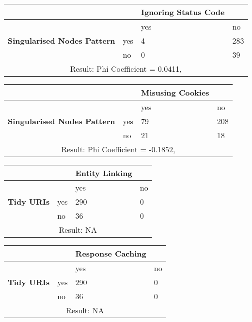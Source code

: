 \documentclass[a4paper,12pt]{article}
\begin{document}
\begin{center}
  \begin{tabular}{| p{60mm} | p{10mm} | p{35mm} | p{35mm} |}
  \hline
   & & \textbf{Ignoring Status Code} &
  \\
  \hline
  & & yes & no
  \\
  \hline
  \textbf{Singularised Nodes Pattern} & yes & 4 & 283
  \\
  \hline
   & no & 0 & 39
  \\
  \hline
  \multicolumn{4}{|c|}{Result: Phi Coefficient = 0.0411, }
  \\ \hline
  \end{tabular}
  \end{center}

\begin{center}
  \begin{tabular}{| p{60mm} | p{10mm} | p{35mm} | p{35mm} |}
  \hline
   & & \textbf{Misusing Cookies} &
  \\
  \hline
  & & yes & no
  \\
  \hline
  \textbf{Singularised Nodes Pattern} & yes & 79 & 208
  \\
  \hline
   & no & 21 & 18
  \\
  \hline
  \multicolumn{4}{|c|}{Result: Phi Coefficient = -0.1852, }
  \\ \hline
  \end{tabular}
  \end{center}

\begin{center}
  \begin{tabular}{| p{60mm} | p{10mm} | p{35mm} | p{35mm} |}
  \hline
   & & \textbf{Entity Linking} &
  \\
  \hline
  & & yes & no
  \\
  \hline
  \textbf{Tidy URIs} & yes & 290 & 0
  \\
  \hline
   & no & 36 & 0
  \\
  \hline
  \multicolumn{4}{|c|}{Result: NA}
  \\ \hline
  \end{tabular}
  \end{center}

\begin{center}
  \begin{tabular}{| p{60mm} | p{10mm} | p{35mm} | p{35mm} |}
  \hline
   & & \textbf{Response Caching} &
  \\
  \hline
  & & yes & no
  \\
  \hline
  \textbf{Tidy URIs} & yes & 290 & 0
  \\
  \hline
   & no & 36 & 0
  \\
  \hline
  \multicolumn{4}{|c|}{Result: NA}
  \\ \hline
  \end{tabular}
  \end{center}
\end{document}
